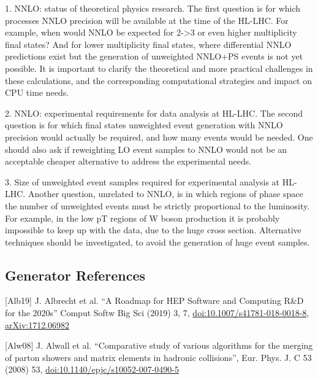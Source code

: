\documentclass[11pt,a4paper]{article}
\begin{document}
1. {NNLO: status of theoretical physics research}. The first question is
for which processes NNLO precision will be available at the time of the
HL-LHC. For example, when would NNLO be expected for 2-\textgreater3 or
even higher multiplicity final states? And for lower multiplicity final
states, where differential NNLO predictions exist but the generation of
unweighted NNLO+PS events is not yet possible. It is important to
clarify the theoretical and more practical challenges in these
calculations, and the corresponding computational strategies and impact
on CPU time needs.

2. {NNLO: experimental requirements for data analysis at HL-LHC}. The
second question is for which final states unweighted event generation
with NNLO precision would actually be required, and how many events
would be needed. One should also ask if reweighting LO event samples to
NNLO would not be an acceptable cheaper alternative to address the
experimental needs.

3. {Size of unweighted event samples required for experimental analysis
at HL-LHC}. Another question, unrelated to NNLO, is in which regions of
phase space the number of unweighted events must be strictly
proportional to the luminosity. For example, in the low pT regions of W
boson production it is probably impossible to keep up with the data, due
to the huge cross section. Alternative techniques should be
investigated, to avoid the generation of huge event samples.

\subsection{Generator References}\label{references}


{[}Alb19{]} J. Albrecht et al. ``A Roadmap for HEP Software and
Computing R\&D for the 2020s'' Comput Softw Big Sci (2019) 3, 7,
\href{https://doi.org/10.1007/s41781-018-0018-8}{{doi:10.1007/s41781-018-0018-8}},
\href{https://arxiv.org/abs/1712.06982}{{arXiv:1712.06982}}

{[}Alw08{]} J. Alwall et al. ``Comparative study of various algorithms
for the merging of parton showers and matrix elements in hadronic
collisions'', Eur. Phys. J. C 53 (2008) 53,
\href{https://doi.org/10.1140/epjc/s10052-007-0490-5}{{doi:10.1140/epjc/s10052-007-0490-5}}
\end{document}
